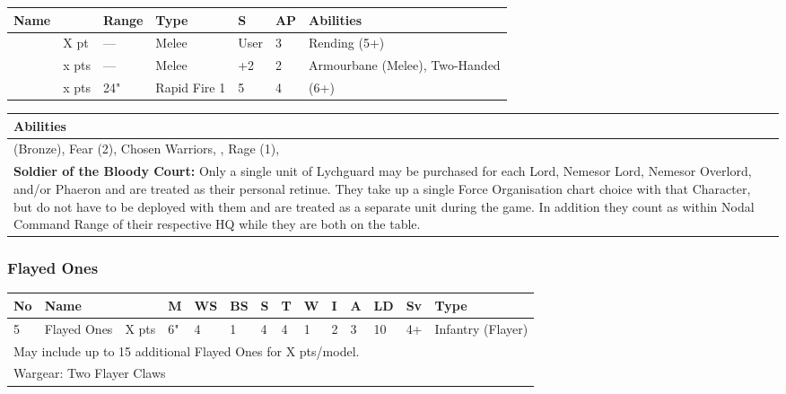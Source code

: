 \noindent
\begin{tabular}{||m{110pt} m{30pt} m{31pt} m{55pt} m{12pt} m{12pt} m{210pt}||}
	\hline
	Name & & Range & Type & S & AP & Abilities \\
	\hline
	\quickref{Hyperphase Sword} & X pt & — & Melee & User & 3 & Rending (5+) \\
	\quickref{Warscythe} & x pts& — & Melee & +2 & 2 & Armourbane (Melee), Two-Handed \\
	\quickref{Gauss Blaster} & x pts& 24" & Rapid Fire 1 & 5 & 4 & \quickref{Gauss} (6+) \\
	\hline
\end{tabular}

\noindent
\begin{tabular}{||m{532pt}||}
	\hline
	Abilities \\
	\hline
	\quickref{Awakening Protocols} (Bronze), Fear (2), Chosen Warriors, \quickref{Living Metal}, Rage (1), \quickref{Reanimation Protocols} \\
	\textbf{Soldier of the Bloody Court:} Only a single unit of Lychguard may be purchased for each Lord, Nemesor Lord, Nemesor Overlord, and/or Phaeron and are treated as their personal retinue. They take up a single Force Organisation chart choice with that Character, but do not have to be deployed with them and are treated as a separate unit during the game. In addition they count as within Nodal Command Range of their respective HQ while they are both on the table. \\
	\hline
\end{tabular}



\newpage
\subsubsection{Flayed Ones}

\noindent
\begin{tabular}{||m{10pt} m{95pt} m{30pt} m{11pt} m{11pt} m{11pt} m{11pt} m{11pt} m{11pt} m{11pt} m{11pt} m{11pt} m{11pt} m{125pt}||}
	\hline
	No & Name & & M & WS & BS & S & T & W & I & A & LD & Sv & Type \\
	\hline
	5 & Flayed Ones & X pts & 6" & 4 & 1 & 4 & 4 & 1 & 2 & 3 & 10 & 4+ & Infantry (Flayer) \\
	\hline
	\hline
	\multicolumn{14}{||Z{532 pt}||}{May include up to 15 additional Flayed Ones for X pts/model.}\\	
	\hline
	\hline
	\multicolumn{14}{||Z{532 pt}||}{Wargear: Two Flayer Claws}\\
	\hline
\end{tabular}

